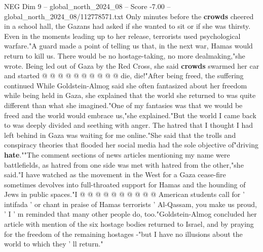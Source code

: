 \begin{textsample}{NEG Dim 9 – global\_north\_2024\_08 – Score -7.00 – global\_north\_2024\_08/112778571.txt}
Only minutes before the \textbf{crowds} cheered in a school hall, the Gazans had asked if she wanted to sit or if she was thirsty.
Even in the moments leading up to her release, terrorists used psychological warfare."A guard made a point of telling us that, in the next war, Hamas would return to kill us.
There would be no hostage-taking, no more dealmaking,"she wrote.
Being led out of Gaza by the Red Cross, she said \textbf{crowds} swarmed her car and started @ @ @ @ @ @ @ @ @ @ die, die!"After being freed, the suffering continued While Goldstein-Almog said she often fantasized about her freedom while being held in Gaza, she explained that the world she returned to was quite different than what she imagined."One of my fantasies was that we would be freed and the world would embrace us,"she explained."But the world I came back to was deeply divided and seething with anger.
The hatred that I thought I had left behind in Gaza was waiting for me online."She said that the trolls and conspiracy theories that flooded her social media had the sole objective of"driving \textbf{hate}.""The comment sections of news articles mentioning my name were battlefields, as hatred from one side was met with hatred from the other,"she said."I have watched as the movement in the West for a Gaza cease-fire sometimes devolves into full-throated support for Hamas and the hounding of Jews in public spaces."I @ @ @ @ @ @ @ @ @ @ American students call for ' intifada ' or chant in praise of Hamas terrorists ' Al-Qassam, you make us proud, ' I ' m reminded that many other people do, too."Goldstein-Almog concluded her article with mention of the six hostage bodies returned to Israel, and by praying for the freedom of the remaining hostages -"but I have no illusions about the world to which they ' ll return."

\end{textsample}
